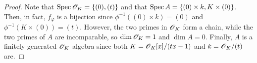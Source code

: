 \begin{proof}
	Note that $\operatorname{Spec}\mathscr{O}_K = \{(0),(t)\}$ and that $\operatorname{Spec} A = \{(0) \times k, K \times (0) \}$. Then, in fact, $f_\varphi$ is a bijection since $\phi^{-1}((0) \times k) = (0)$ and $\phi^{-1}(K \times (0)) = (t)$. However, the two primes in $\mathscr{O}_K$ form a chain, while the two primes of $A$ are incomparable, so $\dim\mathscr{O}_K = 1$ and $\dim A = 0$. Finally, $A$ is a finitely generated $\mathscr{O}_K$-algebra since both $K = \mathscr{O}_K[x]/(tx-1)$ and $k = \mathscr{O}_K/(t)$ are.
\end{proof}
